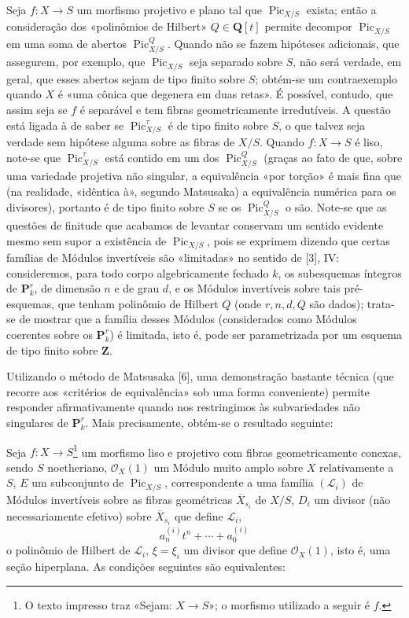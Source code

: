 Seja $f:X\longrightarrow S$ um morfismo projetivo e plano tal que
$\operatorname{Pic}_{X/S}$ exista; então a consideração dos «polinômios de
Hilbert» $Q\in\mathbf Q[t]$ permite decompor $\operatorname{Pic}_{X/S}$ em uma
soma de abertos $\operatorname{Pic}_{X/S}^Q$. Quando não se fazem hipóteses
adicionais, que assegurem, por exemplo, que $\operatorname{Pic}_{X/S}$ seja
separado sobre $S$, não será verdade, em geral, que esses abertos sejam de tipo
finito sobre $S$; obtém-se um contraexemplo quando $X$ é «uma cônica que
degenera em duas retas». É
possível, contudo, que assim seja se $f$ é separável e tem fibras
geometricamente irredutíveis. A questão está ligada à de saber se
$\operatorname{Pic}_{X/S}^\tau$ é de tipo finito sobre $S$, o que talvez seja
verdade sem hipótese alguma sobre as fibras de $X/S$. Quando
$f:X\longrightarrow S$ é liso, note-se que
$\operatorname{Pic}_{X/S}^\tau$ está contido em um dos
$\operatorname{Pic}_{X/S}^Q$ (graças ao fato de que, sobre uma variedade
projetiva não singular, a equivalência «por torção» é mais fina que (na
realidade, «idêntica à», segundo Matsusaka) a equivalência numérica para os
divisores), portanto é de tipo finito sobre $S$ se os
$\operatorname{Pic}_{X/S}^Q$ o são. Note-se que as questões de finitude que
acabamos de levantar conservam um sentido evidente mesmo sem supor a existência
de $\operatorname{Pic}_{X/S}$, pois se exprimem dizendo que certas famílias de
Módulos invertíveis são «limitadas» no sentido de [3], IV: consideremos, para
todo corpo algebricamente fechado $k$, os subesquemas íntegros de
$\mathbf P_k^r$, de dimensão $n$ e de grau $d$, e os Módulos invertíveis sobre
tais pré-esquemas, que tenham polinômio de Hilbert $Q$ (onde $r,n,d,Q$ são
dados); trata-se de mostrar que a família desses Módulos (considerados como
Módulos coerentes sobre os $\mathbf P_k^r$) é limitada, isto é, pode ser
parametrizada por um esquema de tipo finito sobre $\mathbf Z$.

Utilizando o método de Matsusaka [6], uma demonstração bastante técnica (que
recorre aos «critérios de equivalência» sob uma forma conveniente) permite
responder afirmativamente quando nos restringimos às subvariedades não
singulares de $\mathbf P_k^r$. Mais precisamente, obtém-se o resultado seguinte:

 Seja $f:X\longrightarrow S$\footnote{O texto impresso
traz «Sejam: $X\longrightarrow S$»; o morfismo utilizado a seguir é $f$.} um
morfismo liso e projetivo com fibras geometricamente conexas, sendo $S$
noetheriano, $\mathcal O_X(1)$ um Módulo muito amplo sobre $X$ relativamente a
$S$, $E$ um subconjunto de $\operatorname{Pic}_{X/S}$, correspondente a uma
família $(\mathcal L_i)$ de Módulos invertíveis sobre as fibras geométricas
$\overline X_{s_i}$ de $X/S$, $D_i$ um divisor (não necessariamente efetivo)
sobre $\overline X_{s_i}$ que define $\mathcal L_i$,
\[
a_n^{(i)}t^n+\cdots+a_0^{(i)}
\]
o polinômio de Hilbert de $\mathcal L_i$, $\xi=\xi_i$ um divisor que define
$\mathcal O_X(1)$, isto é, uma seção hiperplana. As condições seguintes são
equivalentes:

